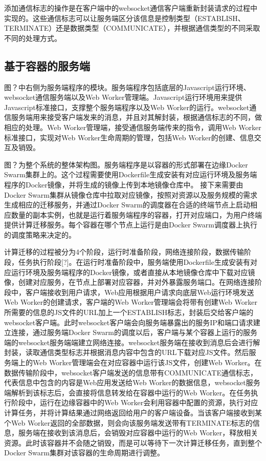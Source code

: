添加通信标志的操作是在客户端中的websocket通信客户端重新封装请求的过程中实现的。这些通信标志可以让服务端区分该信息是控制类型（ESTABLISH、TERMINATE）还是数据类型（COMMUNICATE），并根据通信类型的不同采取不同的处理方式。

\subsection{基于容器的服务端}

图？中右侧为服务端程序的模块。服务端程序包括底层的Javascript运行环境、websocket通信服务端以及Web Worker管理端。Javascript运行环境用来提供Javascript标准接口，支撑整个服务端程序以及Web Worker的运行。websocket通信服务端用来接受客户端发来的消息，并且对其解封装，根据通信标志的不同，做相应的处理。Web Worker管理端，接受通信服务端传来的指令，调用Web Worker标准接口，实现对Web Worker生命周期的管理，包括Web Worker的创建、信息交互及销毁。

图？为整个系统的整体架构图。服务端程序是以容器的形式部署在边缘Docker Swarm集群上的。这个过程需要使用Dockerfile生成安装有对应运行环境及服务端程序的Docker镜像，并将生成的镜像上传到本地镜像仓库中。
接下来需要由Docker Swarm集群从镜像仓库中拉取对应镜像，按照对资源以及服务规模的需求生成相应的迁移服务，并通过Docker Swarm的调度器在合适的终端节点上启动相应数量的副本实例，也就是运行着服务端程序的容器，打开对应端口，为用户终端提供计算迁移服务。每个容器在哪个节点上运行是由Docker Swarm调度器上执行的调度策略来决定的。

计算迁移的过程被分为4个阶段，运行时准备阶段，网络连接阶段，数据传输阶段，任务执行阶段[?]。在运行时准备阶段中，服务端使用Dockerfile生成安装有对应运行环境及服务端程序的Docker镜像，或者直接从本地镜像仓库中下载对应镜像，创建对应服务，在节点上部署对应容器，并对外暴露服务端口。在网络连接阶段中，客户端接收到用户请求，Web应用根据用户请求向底层Web运行环境发送Web Worker的创建请求，客户端的Web Worker管理端会将带有创建Web Worker所需要的信息的JS文件的URL加上一个ESTABLISH标志，封装后交给客户端的websocket客户端。此时websocket客户端会向服务端暴露出的服务IP和端口请求建立连接，通过服务端Docker Swarm的调度以后，客户端与某个容器上运行的服务端的websocket服务端端建立网络连接。websocket服务端在接收到消息后会进行解封装，读取通信类型标志并根据消息内容中包含的URL下载对应JS文件。然后服务端上的Web Worker管理端会在对应容器中运行该JS文件，创建Web Worker。在数据传输阶段中，websocket客户端发送的信息带有COMMUNICATE通信标志，代表信息中包含的内容是Web应用发送给Web Worker的数据信息，websocket服务端解析到该标志后，会直接将信息转发给在容器中运行的Web Worker。在任务执行阶段中，运行在边缘容器中的Web Worker会利用容器中配置的资源，执行对应计算任务，并将计算结果通过网络返回给用户的客户端设备。当该客户端接收到某个Web Worker返回的全部数据，则会向该服务端发送带有TERMINATE标志的信息，服务端在接收到该消息后，会销毁对应容器中运行的Web Worker，释放相关资源。此时该容器并不会随之销毁，而是可以等待下一次计算迁移任务，直到整个Docker Swarm集群对该容器的生命周期进行调整。

